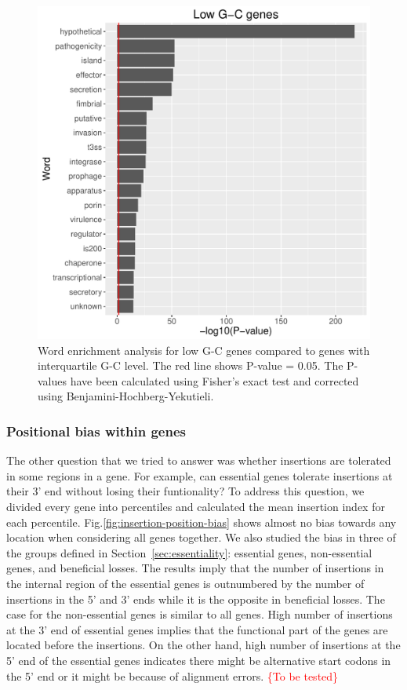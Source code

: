 \documentclass[12pt,letterpaper]{article}
\begin{document}
\begin{figure}
\includegraphics[scale=0.55]{lowgc-pval.pdf}
\caption{Word enrichment analysis for low G-C genes compared to genes with interquartile G-C level. The red line shows P-value = 0.05. The P-values have been calculated using Fisher's exact test and corrected using Benjamini-Hochberg-Yekutieli.}
\label{fig:gc-pval}
\end{figure}

\subsubsection{Positional bias within genes}
The other question that we tried to answer was whether insertions are tolerated in some regions in a gene. For example, can essential genes tolerate insertions at their 3' end without losing their funtionality? To address this question, we divided every gene into percentiles and calculated the mean insertion index for each percentile. Fig.\@ \ref{fig:insertion-position-bias} shows almost no bias towards any location when considering all genes together. We also studied the bias in three of the groups defined in Section~\ref{sec:essentiality}: essential genes, non-essential genes, and beneficial losses. The results imply that the number of insertions in the internal region of the essential genes is outnumbered by the number of insertions in the 5' and 3' ends while it is the opposite in beneficial losses. The case for the non-essential genes is similar to all genes. High number of insertions at the 3' end of essential genes implies that the functional part of the genes are located before the insertions. On the other hand, high number of insertions at the 5' end of the essential genes indicates there might be alternative start codons in the 5' end or it might be because of alignment errors. \textcolor{red}{\{To be tested\}}
\end{document}
